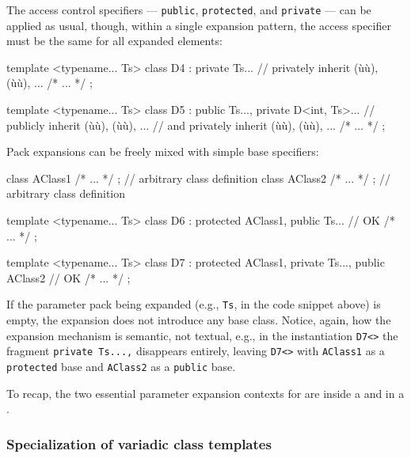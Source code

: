 \noindent The access control specifiers --- \lstinline!public!, \lstinline!protected!,
and \lstinline!private! --- can be applied as usual, though, within a
single expansion pattern, the access specifier must be the same for all
expanded elements:

\begin{emcppslisting}
template <typename... Ts>
class D4 : private Ts...   // privately inherit (ù{}ù), (ù{}ù), ...
{ /* ... */ };

template <typename... Ts>
class D5 : public Ts..., private D<int, Ts>...
    // publicly inherit (ù{}ù), (ù{}ù), ...
    // and privately inherit (ù{}ù), (ù{}ù), ...
{ /* ... */ };
\end{emcppslisting}
    

\noindent Pack expansions can be freely mixed with simple base specifiers:

\begin{emcppslisting}
class AClass1 { /* ... */ };  // arbitrary class definition
class AClass2 { /* ... */ };  // arbitrary class definition

template <typename... Ts>
class D6 : protected AClass1, public Ts...                   // OK
{ /* ... */ };

template <typename... Ts>
class D7 : protected AClass1, private Ts..., public AClass2  // OK
{ /* ... */ };
\end{emcppslisting}
    

\noindent If the parameter pack being expanded (e.g., \lstinline!Ts!, in the code
snippet above) is empty, the expansion does not introduce any base
class. Notice, again, how the expansion mechanism is semantic, not
textual, e.g., in the instantiation \lstinline!D7<>! the fragment
\lstinline!private!~\lstinline!Ts...,! disappears entirely, leaving
\lstinline!D7<>! with \lstinline!AClass1! as a \lstinline!protected! base and
\lstinline!AClass2! as a \lstinline!public! base.

To recap, the two essential parameter expansion contexts for
 are inside a  and in a .

\subsubsection[Specialization of variadic class templates]{Specialization of variadic class templates}\label{specialization-of-variadic-class-templates}

